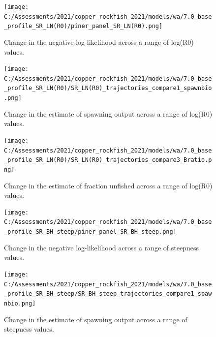 \documentclass[11pt,
  english,
  a4paper,
]{article}
\begin{document}
\begin{figure}
\centering
\texttt{[image: C:/Assessments/2021/copper\_rockfish\_2021/models/wa/7.0\_base\_profile\_SR\_LN(R0)/piner\_panel\_SR\_LN(R0).png]}
\caption{Change in the negative log-likelihood across a range of log(R0) values.\label{fig:r0-profile}}
\end{figure}

\tagmcend\tagstructend


\begin{figure}
\centering
\texttt{[image: C:/Assessments/2021/copper\_rockfish\_2021/models/wa/7.0\_base\_profile\_SR\_LN(R0)/SR\_LN(R0)\_trajectories\_compare1\_spawnbio.png]}
\caption{Change in the estimate of spawning output across a range of log(R0) values.\label{fig:r0-ssb}}
\end{figure}

\tagmcend\tagstructend


\begin{figure}
\centering
\texttt{[image: C:/Assessments/2021/copper\_rockfish\_2021/models/wa/7.0\_base\_profile\_SR\_LN(R0)/SR\_LN(R0)\_trajectories\_compare3\_Bratio.png]}
\caption{Change in the estimate of fraction unfished across a range of log(R0) values.\label{fig:r0-depl}}
\end{figure}

\tagmcend\tagstructend


\begin{figure}
\centering
\texttt{[image: C:/Assessments/2021/copper\_rockfish\_2021/models/wa/7.0\_base\_profile\_SR\_BH\_steep/piner\_panel\_SR\_BH\_steep.png]}
\caption{Change in the negative log-likelihood across a range of steepness values.\label{fig:h-profile}}
\end{figure}

\tagmcend\tagstructend


\begin{figure}
\centering
\texttt{[image: C:/Assessments/2021/copper\_rockfish\_2021/models/wa/7.0\_base\_profile\_SR\_BH\_steep/SR\_BH\_steep\_trajectories\_compare1\_spawnbio.png]}
\caption{Change in the estimate of spawning output across a range of steepness values.\label{fig:h-ssb}}
\end{figure}
\end{document}
